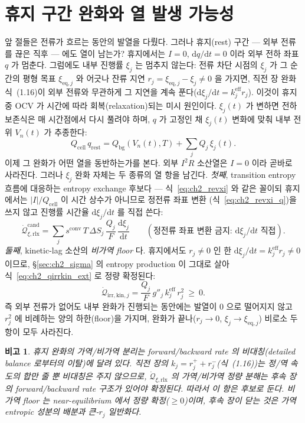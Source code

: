 \documentclass[11pt,a4paper]{article}
\newtheorem*{flagbox}{비고}
\newcommand{\dd}{\mathrm{d}}
\newcommand{\eff}{\mathrm{eff}}
\newcommand{\eq}{\mathrm{eq}}
\newcommand{\cell}{\mathrm{cell}}
\newcommand{\bg}{\mathrm{bg}}
\newcommand{\irr}{\mathrm{irr}}
\newcommand{\rlx}{\mathrm{rlx}}
\newcommand{\kin}{\mathrm{kin}}
\newcommand{\conv}{\mathrm{conv}}
\newcommand{\cand}{\mathrm{cand}}
\begin{document}
\section{휴지 구간 완화와 열 발생 가능성}\label{sec:ch2_rest}
앞 절들은 전류가 흐르는 동안의 발열을 다뤘다. 그러나 휴지(rest) 구간 — 외부 전류를 끊은 직후 — 에도 열이
남는가? 휴지에서는 $I=0$, $\dd q/\dd t=0$ 이라 외부 전하 좌표 $q$ 가 멈춘다. 그럼에도 내부 진행률 $\xi_j$ 는
멈추지 않는다: 전류 차단 시점의 $\xi_j$ 가 그 순간의 평형 목표 $\xi_{\eq,j}$ 와 어긋나 잔류 지연 $r_j=\xi_{\eq,j}-\xi_j\ne0$
을 가지면, 직전 장 완화식~(1.16)이 외부 전류와 무관하게 그 지연을 계속 푼다($\dd\xi_j/\dd t=k_j^{\eff}r_j$). 이것이
휴지 중 OCV 가 시간에 따라 회복(relaxation)되는 미시 원인이다. $\xi_j(t)$ 가 변하면 전하 보존식은 매 시간점에서 다시
풀려야 하며, $q$ 가 고정인 채 $\xi_j(t)$ 변화에 맞춰 내부 전위 $V_n(t)$ 가 추종한다:
\begin{equation}
Q_\cell\,q_{\mathrm{rest}}=Q_\bg(V_n(t),T)+\sum_j Q_j\,\xi_j(t).
\label{eq:ch2_rest_balance}
\end{equation}
이제 그 완화가 어떤 열을 동반하는가를 본다. 외부 $I^2R$ 소산열은 $I=0$ 이라 곧바로 사라진다. 그러나 $\xi_j$
완화 자체는 두 종류의 열 항을 남긴다. \emph{첫째}, transition entropy 흐름에 대응하는 entropy exchange 후보다 —
식~\eqref{eq:ch2_revxi} 와 같은 꼴이되 휴지에서는 $|I|/Q_\cell$ 이 시간 상수가 아니므로 정전류 좌표 변환
(식~\eqref{eq:ch2_revxi_q})을 쓰지 않고 진행률 시간율 $\dd\xi_j/\dd t$ 를 직접 쓴다:
\begin{equation}
\dot{\mathcal Q}_{\xi,\rlx}^{\cand}=\sum_j s^{\conv}\,T\,\Delta S_j\,\frac{Q_j}{F}\,\frac{\dd\xi_j}{\dd t}
\qquad(\text{정전류 좌표 변환 금지: }\dd\xi_j/\dd t\text{ 직접}).
\label{eq:ch2_relax}
\end{equation}
\emph{둘째}, kinetic-lag 소산의 \emph{비가역 floor} 다. 휴지에서도 $r_j\ne0$ 인 한 $\dd\xi_j/\dd t=k_j^{\eff}r_j\ne0$
이므로, \S\ref{sec:ch2_sigma} 의 entropy production 이 그대로 살아 식~\eqref{eq:ch2_qirrkin_ext} 로 정량
확정된다:
\begin{equation}
\dot{\mathcal Q}_{\irr,\kin,j}=\frac{Q_j}{F}\,g''_j\,k_j^{\eff}\,r_j^2\ \ge\ 0.
\label{eq:ch2_rest_floor}
\end{equation}
즉 외부 전류가 없어도 내부 완화가 진행되는 동안에는 발열이 0 으로 떨어지지 않고 $r_j^2$ 에 비례하는 양의
하한(floor)을 가지며, 완화가 끝나($r_j\to0$, $\xi_j\to\xi_{\eq,j}$) 비로소 두 항이 모두 사라진다.
\begin{flagbox}
휴지 완화의 가역/비가역 분리는 forward/backward rate 의 비대칭(detailed balance 로부터의 이탈)에 달려 있다.
직전 장의 $k_j=r_j^++r_j^-$(식~(1.16))는 정/역 속도의 \emph{합}만 줄 뿐 비대칭은 주지 않으므로,
$\dot{\mathcal Q}_{\xi,\rlx}$ 의 가역/비가역 \emph{정량} 분해는 후속 장의 forward/backward rate 구조가 있어야
확정된다. 따라서 이 항은 \emph{후보}로 둔다. 비가역 floor 는 near-equilibrium 에서 정량 확정($\ge0$)이며, 후속
장이 닫는 것은 가역 entropic 성분의 배분과 큰-$r_j$ 일반화다.
\end{flagbox}
\end{document}
